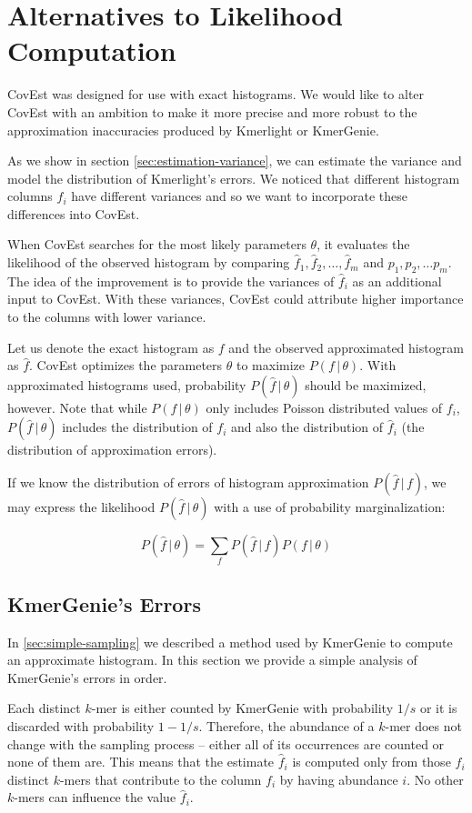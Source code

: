 \section{Alternatives to Likelihood Computation}
CovEst was designed for use with exact histograms.
We would like to alter CovEst with an ambition to make it more 
precise and more robust to the approximation inaccuracies produced by
Kmerlight or KmerGenie.

As we show in section \ref{sec:estimation-variance}, we can estimate the variance and 
model the distribution of Kmerlight's errors. We noticed that different histogram columns $f_i$
have different variances and so we want to incorporate these differences into CovEst.

When CovEst searches for the most likely parameters $\theta$, it evaluates the likelihood
of the observed histogram by comparing $\hat f_1, \hat f_2, \dots, \hat f_m$ and 
$p_1, p_2, \dots p_m$. The idea of the improvement is to provide the variances of 
$\hat f_i$ as an additional input to CovEst. With these variances, CovEst could
attribute higher importance to the columns with lower variance.

\medskip

Let us denote the exact histogram as $f$ and the observed approximated histogram as $\hat f$.
CovEst optimizes the parameters $\theta$ to maximize $P(f\,|\,\theta)$.
With approximated histograms used, probability $P(\hat f\,|\,\theta)$ should be maximized, however.
Note that while $P(f\,|\,\theta)$ only includes Poisson distributed values of $f_i$,
$P(\hat f\,|\,\theta)$ includes the distribution of $f_i$ and also the distribution of 
$\hat f_i$ (the distribution of approximation errors).

If we know the distribution of errors of histogram approximation $P(\hat f\,|\,f)$,
we may express the likelihood $P(\hat f\,|\,\theta)$ with a use of probability marginalization:

$$P(\hat f\,|\,\theta) = \sum_f P(\hat f\,|\,f)P(f\,|\,\theta)$$

\subsection{KmerGenie's Errors}
\label{sec:kmergenie-errors}
In \ref{sec:simple-sampling} we described a method used by KmerGenie to compute 
an approximate histogram. In this section we provide a simple analysis of KmerGenie's
errors in order.

Each distinct $k$-mer is either counted by KmerGenie with probability $1/s$ or it is discarded 
with probability $1 - 1/s$. Therefore, the abundance of a $k$-mer does not change 
with the sampling process -- either all of its occurrences are counted or none of them are.
This means that the estimate $\hat f_i$ is computed only from those $f_i$ distinct $k$-mers 
that contribute to the column $f_i$ by having abundance $i$. No other $k$-mers can
influence the value $\hat f_i$.

